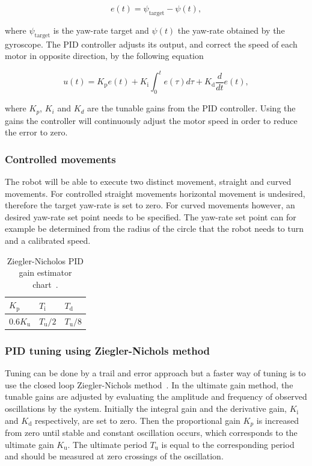 \begin{equation}
	e(t) = \psi_{\text{target}} - \psi(t),
\end{equation}

\noindent
where $\psi_{\text{target}}$ is the yaw-rate target and $\psi(t)$ the yaw-rate obtained by the gyroscope.
The PID controller adjusts its output, and correct the speed of each motor in opposite direction, by the following equation

\begin{equation}
u(t) = K_{\text{p}}e(t) + K_{\text{i}} \int_{0}^{t}e(\tau)d\tau + K_{\text{d}}\frac{d}{dt}e(t),
\end{equation}

\noindent
where $K_{p}$, $K_{i}$ and $K_{d}$ are the tunable gains from the PID controller.
Using the gains the controller will continuously adjust the motor speed in order to reduce the error to zero.

\subsubsection{Controlled movements}

The robot will be able to execute two distinct movement, straight and curved movements.
For controlled straight movements horizontal movement is undesired, therefore the target yaw-rate is set to zero.
For curved movements however, an desired yaw-rate set point needs to be specified.
The yaw-rate set point can for example be determined from the radius of the circle that the robot needs to turn and a calibrated speed.

\begin{table}[t]
	\centering
	\caption{Ziegler-Nicholos PID gain estimator chart~\cite{franklin_feedback_2015}.}
	\label{tab:gain_chart}
	\begin{tabular}{|l|l|l|} 
		\hline
		$K_{\text{p}}$ & $T_{\text{i}}$ & $T_{\text{d}}$ \\
		\hline \hline
		0.6$K_{\text{u}}$ & $T_{\text{u}}/2$ & $T_{\text{u}}/8$ \\
		\hline
	\end{tabular}
\end{table}

\subsubsection{PID tuning using Ziegler-Nichols method}

Tuning can be done by a trail and error approach but a faster way of tuning is to use the closed loop Ziegler-Nichols method~\cite{franklin_feedback_2015}.
In the ultimate gain method, the tunable gains are adjusted by evaluating the amplitude and frequency of observed oscillations by the system.
Initially the integral gain and the derivative gain, $K_{\text{i}}$ and $K_{\text{d}}$ respectively, are set to zero.
Then the proportional gain $K_{p}$ is increased from zero until stable and constant oscillation occurs, which corresponds to the ultimate gain $K_{\text{u}}$.
The ultimate period $T_{\text{u}}$ is equal to the corresponding period and should be measured at zero crossings of the oscillation.

